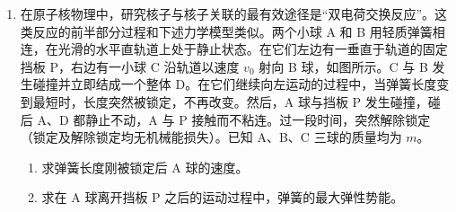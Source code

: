 \documentclass[\gkver]{gaokaozhenti}
\begin{document}
\begin{enumerate}
{

评分标准：本题 13 分。①式 2 分，②式 2 分，经分析得出③式 6 分，解得④式 3 分。
}

\item
在原子核物理中，研究核子与核子关联的最有效途径是“双电荷交换反应”。这类反应的前半部分过程和下述力学模型类似。两个小球 A 和 B 用轻质弹簧相连，在光滑的水平直轨道上处于静止状态。在它们左边有一垂直于轨道的固定挡板 P，右边有一小球 C 沿轨道以速度 $v_{0}$ 射向 B 球，如图所示。C 与 B 发生碰撞并立即结成一个整体 D。在它们继续向左运动的过程中，当弹簧长度变到最短时，长度突然被锁定，不再改变。然后，A 球与挡板 P 发生碰撞，碰后 A、D 都静止不动，A 与 P 接触而不粘连。过一段时间，突然解除锁定（锁定及解除锁定均无机械能损失）。已知 A、B、C 三球的质量均为 $m$。
\begin{enumerate}
\item
求弹簧长度刚被锁定后 A 球的速度。

\item
求在 A 球离开挡板 P 之后的运动过程中，弹簧的最大弹性势能。
\end{enumerate}


\end{enumerate}
\end{document}
